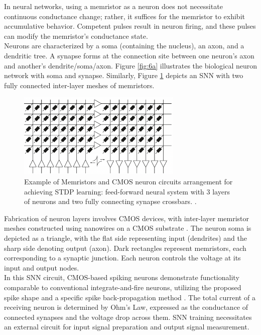 \noindent In neural networks, using a memristor as a neuron does not necessitate continuous conductance change; rather, it suffices for the memristor to exhibit accumulative behavior. Competent pulses result in neuron firing, and these pulses can modify the memristor's conductance state.\\


\noindent Neurons are characterized by a soma (containing the nucleus), an axon, and a dendritic tree. A synapse forms at the connection site between one neuron's axon and another's dendrite/soma/axon. Figure \ref{fig:6a} illustrates the biological neuron network with soma and synapse. Similarly, Figure \ref{fig:6b} depicts an SNN with two fully connected inter-layer meshes of memristors.\\

\begin{figure}[htbp!] 
    \centering    
    \includegraphics[width=0.7\textwidth]{Chapter6/Figs/b.png}
    \caption[Example of Memristors and CMOS neuron circuits arrangement for achieving STDP learning.]{Example of Memristors and CMOS neuron circuits arrangement for achieving STDP learning: feed-forward neural system with 3 layers of neurons and two fully connecting synapse crossbars. \cite{saighi2015plasticity}.}
    \label{fig:6b}
\end{figure}

\noindent Fabrication of neuron layers involves CMOS devices, with inter-layer memristor meshes constructed using nanowires on a CMOS substrate \cite{saighi2015plasticity}. The neuron soma is depicted as a triangle, with the flat side representing input (dendrites) and the sharp side denoting output (axon). Dark rectangles represent memristors, each corresponding to a synaptic junction. Each neuron controls the voltage at its input and output nodes.\\

\noindent In this SNN circuit, CMOS-based spiking neurons demonstrate functionality comparable to conventional integrate-and-fire neurons, utilizing the proposed spike shape and a specific spike back-propagation method \cite{prezioso2016self}. The total current of a receiving neuron is determined by Ohm's Law, expressed as the conductance of connected synapses and the voltage drop across them. SNN training necessitates an external circuit for input signal preparation and output signal measurement.

